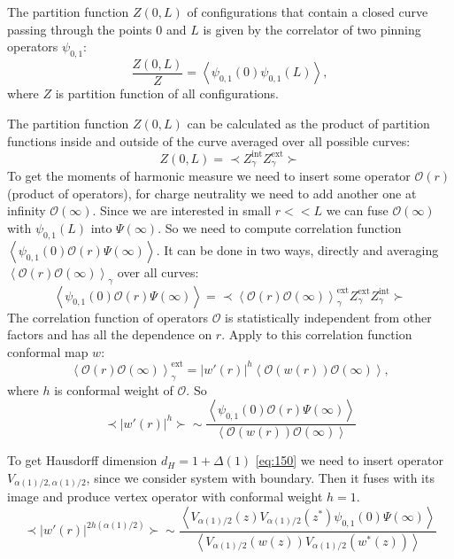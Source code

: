 \documentclass[12pt]{article}
\begin{document}
The partition function $Z(0,L)$ of configurations that contain a closed curve passing through the
points $0$ and $L$ is given by the correlator of two pinning operators $\psi_{0,1}$:
\begin{equation}
  \label{eq:151}
  \frac{Z(0,L)}{Z}=\left<\psi_{0,1}(0)\psi_{0,1}(L)\right>,
\end{equation}
where $Z$ is partition function of all configurations. 

The partition function $Z(0,L)$ can be calculated as the product of partition functions inside and
outside of the curve averaged over all possible curves:
\begin{equation}
  \label{eq:152}
  Z(0,L)=\prec Z_{\gamma}^{\mathrm{int}} Z_{\gamma}^{\mathrm{ext}}\succ
\end{equation}
To get the moments of harmonic measure we need to insert some operator $\mathcal{O}(r)$ (product of
operators), for charge neutrality we need to add another one at infinity $\mathcal{O}(\infty)$.
Since we are interested in small $r<<L$ we can fuse $\mathcal{O}(\infty)$ with $\psi_{0,1}(L)$ into
$\Psi(\infty)$. So we need to compute correlation function $\left<\psi_{0,1}(0) \mathcal{O}(r)
  \Psi(\infty)\right>$. It can be done in two ways, directly and averaging
$\left<\mathcal{O}(r)\mathcal{O}(\infty)\right>_{\gamma}$ over all curves:
\begin{equation}
  \label{eq:153}
  \left<\psi_{0,1}(0) \mathcal{O}(r)\Psi(\infty)\right>= \prec
  \left<\mathcal{O}(r)\mathcal{O}(\infty)\right>_{\gamma}^{\mathrm{ext}} Z_{\gamma}^{\mathrm{ext}} Z_{\gamma}^{\mathrm{int}}\succ
\end{equation}
The correlation function of operators $\mathcal{O}$ is statistically independent from other factors
and has all the dependence on $r$. Apply to this correlation function conformal map $w$:
\begin{equation}
  \label{eq:154}
  \left<\mathcal{O}(r)\mathcal{O}(\infty)\right>_{\gamma}^{\mathrm{ext}}=|w'(r)|^{h}\left<\mathcal{O}(w(r))\mathcal{O}(\infty)\right>,
\end{equation}
where $h$ is conformal weight of $\mathcal{O}$. So
\begin{equation}
  \label{eq:155}
  \prec|w'(r)|^{h}\succ\sim\frac{ \left<\psi_{0,1}(0) \mathcal{O}(r)\Psi(\infty)\right>}{\left<\mathcal{O}(w(r))\mathcal{O}(\infty)\right>}
\end{equation}

To get Hausdorff dimension $d_{H}=1+\Delta(1)$ \eqref{eq:150} we need to insert operator
$V_{\alpha(1)/2,\alpha(1)/2}$, since we consider system with boundary. Then it fuses with its image
and produce vertex operator with conformal weight $h=1$. 
\begin{equation}
  \label{eq:156}
  \prec|w'(r)|^{2h(\alpha(1)/2)}\succ\sim\frac{\left< V_{\alpha(1)/2}(z) V_{\alpha(1)/2}(z^{*}) \psi_{0,1}(0) \Psi(\infty)\right>}{\left<V_{\alpha(1)/2}(w(z)) V_{\alpha(1)/2}(w^{*}(z))\right>}
\end{equation}
\end{document}

